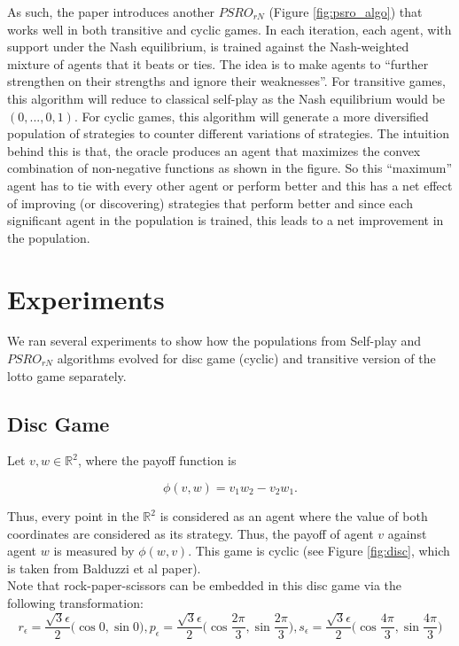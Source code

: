 \documentclass{article}
\begin{document}
As such, the paper introduces another $PSRO_{rN}$ (Figure \ref{fig:psro_algo}) that works well in both transitive and cyclic games. In each iteration, each agent, with support under the Nash equilibrium, is trained against the Nash-weighted mixture of agents that it beats or ties. The idea is to make agents to ``further strengthen on their strengths and ignore their weaknesses''. For transitive games, this algorithm will reduce to classical self-play as the Nash equilibrium would be $(0,...,0,1)$. For cyclic games, this algorithm will generate a more diversified population of strategies to counter different variations of strategies. The intuition behind this is that, the oracle produces an agent that maximizes the convex combination of non-negative functions as shown in the figure. So this ``maximum'' agent has to tie with every other agent or perform better and this has a net effect of improving (or discovering) strategies that perform better and since each significant agent in the population is trained, this leads to a net improvement in the population. 

\section{Experiments}

We ran several experiments to show how the populations from Self-play and $PSRO_{rN}$ algorithms evolved for disc game (cyclic) and transitive version of the lotto game separately.

\subsection{Disc Game \cite{Balduzzi2019OpenendedLI}}

Let $v,w \in \mathbb{R}^2$, where the payoff function is

$$\phi(v,w) = v_1w_2-v_2w_1.$$

Thus, every point in the $\mathbb{R}^2$ is considered as an agent where the value of both coordinates are considered as its strategy. Thus, the payoff of agent $v$ against agent $w$ is measured by $\phi(w,v)$. This game is cyclic (see Figure \ref{fig:disc}, which is taken from Balduzzi et al paper).\\

Note that rock-paper-scissors can be embedded in this disc game via the following transformation: $$r_\epsilon = \frac{\sqrt{3}\epsilon}{2} \big( \cos 0, \sin 0 \big), p_\epsilon = \frac{\sqrt{3}\epsilon}{2} \big(\cos \frac{2\pi}{3}, \sin \frac{2\pi}{3}\big), s_\epsilon = \frac{\sqrt{3}\epsilon}{2} \big(\cos \frac{4\pi}{3}, \sin \frac{4\pi}{3}\big)$$
\end{document}
